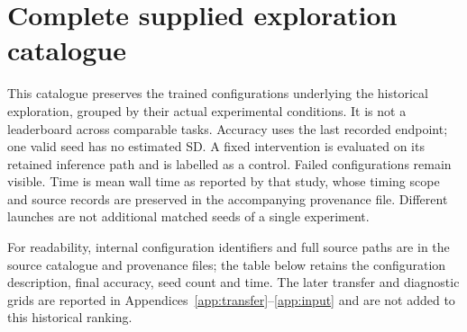 \section{Complete supplied exploration catalogue}
\label{app:catalogue}
This catalogue preserves the trained configurations underlying the historical exploration, grouped by their actual experimental conditions. It is not a leaderboard across comparable tasks. Accuracy uses the last recorded endpoint; one valid seed has no estimated SD. A fixed intervention is evaluated on its retained inference path and is labelled as a control. Failed configurations remain visible. Time is mean wall time as reported by that study, whose timing scope and source records are preserved in the accompanying provenance file. Different launches are not additional matched seeds of a single experiment.

For readability, internal configuration identifiers and full source paths are in the source catalogue and provenance files; the table below retains the configuration description, final accuracy, seed count and time. The later transfer and diagnostic grids are reported in Appendices~\ref{app:transfer}--\ref{app:input} and are not added to this historical ranking.

